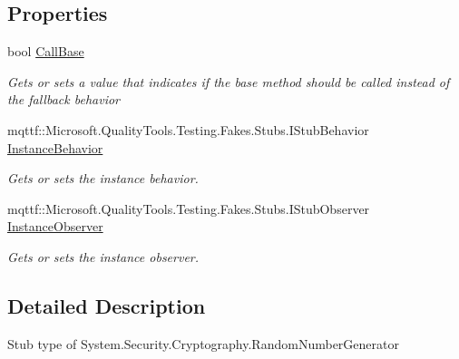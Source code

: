 \subsection*{Properties}
\begin{DoxyCompactItemize}
\item 
bool \hyperlink{class_system_1_1_security_1_1_cryptography_1_1_fakes_1_1_stub_random_number_generator_a07da80cb2820ba143aeae048f948f336}{Call\-Base}
\begin{DoxyCompactList}\small\item\em Gets or sets a value that indicates if the base method should be called instead of the fallback behavior\end{DoxyCompactList}\item 
mqttf\-::\-Microsoft.\-Quality\-Tools.\-Testing.\-Fakes.\-Stubs.\-I\-Stub\-Behavior \hyperlink{class_system_1_1_security_1_1_cryptography_1_1_fakes_1_1_stub_random_number_generator_aa175c81914f39e1bf90dbd521db4b320}{Instance\-Behavior}
\begin{DoxyCompactList}\small\item\em Gets or sets the instance behavior.\end{DoxyCompactList}\item 
mqttf\-::\-Microsoft.\-Quality\-Tools.\-Testing.\-Fakes.\-Stubs.\-I\-Stub\-Observer \hyperlink{class_system_1_1_security_1_1_cryptography_1_1_fakes_1_1_stub_random_number_generator_a30208c8b3600b89db80823166280736a}{Instance\-Observer}
\begin{DoxyCompactList}\small\item\em Gets or sets the instance observer.\end{DoxyCompactList}\end{DoxyCompactItemize}


\subsection{Detailed Description}
Stub type of System.\-Security.\-Cryptography.\-Random\-Number\-Generator



